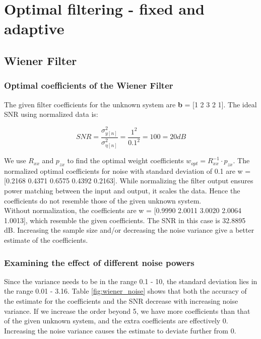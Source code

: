 \documentclass{article}
\begin{document}
\section{Optimal filtering - fixed and adaptive}
\vspace{0.5cm}

\subsection{Wiener Filter}

\subsubsection{Optimal coefficients of the Wiener Filter}

The given filter coefficients for the unknown system are \textbf{b} = [1 2 3 2 1]. The ideal SNR using normalized data is:

\begin{equation*}
SNR = \frac{\sigma_{y[n]}^2}{\sigma_{\eta[n]}^2} = \frac{1^2}{0.1^2}=100=20dB
\end{equation*}

We use $R_{xx}$ and $p_{zx}$ to find the optimal weight coefficients $w_{opt}=R_{xx}^{-1} \cdot p_{zx}$. The normalized optimal coefficients for noise with standard deviation of 0.1 are w = [0.2168 0.4371 0.6575 0.4392 0.2163]. While normalizing the filter output ensures power matching between the input and output, it scales the data. Hence the coefficients do not resemble those of the given unknown system.\\

Without normalization, the coefficients are w = [0.9990 2.0011 3.0020 2.0064 1.0013], which resemble the given coefficients. The SNR in this case is 32.8895 dB. Increasing the sample size and/or decreasing the noise variance give a better estimate of the coefficients.


\subsubsection{Examining the effect of different noise powers}

Since the variance needs to be in the range 0.1 - 10, the standard deviation lies in the range 0.01 - 3.16. Table \ref{fig:wiener_noise} shows that both the accuracy of the estimate for the coefficients and the SNR decrease with increasing noise variance. If we increase the order beyond 5, we have more coefficients than that of the given unknown system, and the extra coefficients are effectively 0. Increasing the noise variance causes the estimate to deviate further from 0.
\end{document}
